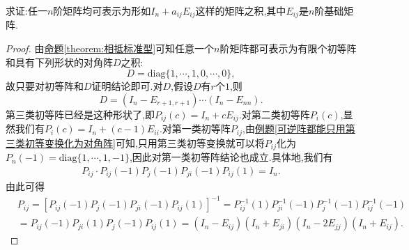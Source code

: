 \documentclass[../../main.tex]{subfiles}%
\begin{document}
\begin{example}
求证:任一\(n\)阶矩阵均可表示为形如\(I_n + a_{ij}E_{ij}\)这样的矩阵之积,其中\(E_{ij}\)是\(n\)阶基础矩阵.
\end{example}
\begin{proof}
由\hyperref[theorem:相抵标准型]{命题\ref{theorem:相抵标准型}}可知任意一个\(n\)阶矩阵都可表示为有限个初等阵和具有下列形状的对角阵\(D\)之积:
\[
D = \mathrm{diag}\{1,\cdots,1,0,\cdots,0\},
\]
故只要对初等阵和\(D\)证明结论即可.对\(D\),假设\(D\)有\(r\)个\(1\),则
\[
D = (I_n - E_{r + 1,r + 1})\cdots(I_n - E_{nn}).
\]
第三类初等阵已经是这种形状了,即$P_{ij}\left( c \right) =I_n+cE_{ij}$.对第二类初等阵\(P_i(c)\),显然我们有\(P_i(c) = I_n + (c - 1)E_{ii}\).对第一类初等阵\(P_{ij}\),由\hyperref[可逆阵都能只用第三类初等变换化为对角阵]{例题\ref{可逆阵都能只用第三类初等变换化为对角阵}}可知,只用第三类初等变换就可以将\(P_{ij}\)化为\(P_n(-1) = \mathrm{diag}\{1,\cdots,1,-1\}\),因此对第一类初等阵结论也成立.具体地,我们有
\begin{align*}
P_{ij}\cdot P_{ij}\left( -1 \right) P_j\left( -1 \right) P_{ji}\left( -1 \right) P_{ij}\left( 1 \right) =I_n. 
\end{align*}
由此可得
\begin{align*}
&P_{ij}=\left[ P_{ij}\left( -1 \right) P_j\left( -1 \right) P_{ji}\left( -1 \right) P_{ij}\left( 1 \right) \right] ^{-1}=P_{ij}^{-1}\left( 1 \right) P_{ji}^{-1}\left( -1 \right) P_{j}^{-1}\left( -1 \right) P_{ij}^{-1}\left( -1 \right) 
\\
&=P_{ij}\left( -1 \right) P_{ji}\left( 1 \right) P_j\left( -1 \right) P_{ij}\left( 1 \right) =\left( I_n-E_{ij} \right) \left( I_n+E_{ji} \right) \left( I_n-2E_{jj} \right) \left( I_n+E_{ij} \right) .
\end{align*}
\end{proof}
\end{document}
